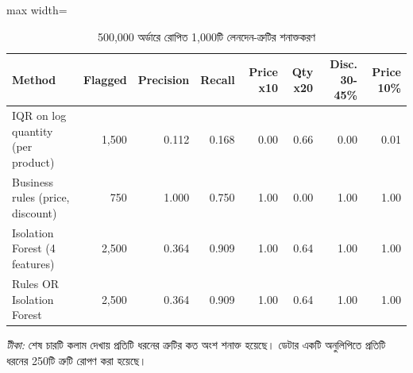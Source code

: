 \begin{table}[htbp]
\centering
\footnotesize
\caption{500,000 অর্ডারে রোপিত 1,000টি লেনদেন-ত্রুটির শনাক্তকরণ}
\label{tab:anomaly}
\begin{adjustbox}{max width=\linewidth}
\begin{tabular}{lrrrrrrr}
\toprule
\textbf{Method} & \textbf{Flagged} & \textbf{Precision} & \textbf{Recall} & \textbf{Price x10} & \textbf{Qty x20} & \textbf{Disc. 30-45\%} & \textbf{Price 10\%} \\
\midrule
IQR on log quantity (per product) & 1,500 & 0.112 & 0.168 & 0.00 & 0.66 & 0.00 & 0.01 \\
Business rules (price, discount) & 750 & 1.000 & 0.750 & 1.00 & 0.00 & 1.00 & 1.00 \\
Isolation Forest (4 features) & 2,500 & 0.364 & 0.909 & 1.00 & 0.64 & 1.00 & 1.00 \\
Rules OR Isolation Forest & 2,500 & 0.364 & 0.909 & 1.00 & 0.64 & 1.00 & 1.00 \\
\bottomrule
\end{tabular}
\end{adjustbox}
\par\smallskip\parbox{0.92\linewidth}{\footnotesize\emph{টীকা:} শেষ চারটি কলাম দেখায় প্রতিটি ধরনের ত্রুটির কত অংশ শনাক্ত হয়েছে। ডেটার একটি অনুলিপিতে প্রতিটি ধরনের 250টি ত্রুটি রোপণ করা হয়েছে।}
\end{table}